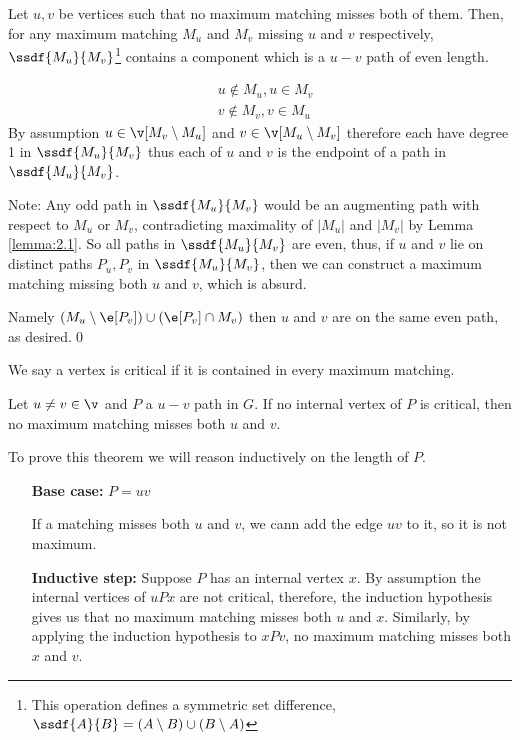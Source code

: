 \begin{prf}
    \begin{customclaim}{1}
    \label{claim:theorem_2.10_1}
        Let $u, v$ be vertices such that no maximum matching misses both of them. Then, for any maximum matching $M_u$ and $M_v$ missing $u$ and $v$ respectively, $\ssdf{M_u}{M_v}$\footnote{This operation defines a symmetric set difference, $\ssdf{A}{B} = (A \setminus B) \cup (B \setminus A)$} contains a component which is a $u - v$ path of even length.
    \end{customclaim}
    \begin{prf}
        \begin{align*}
            &u \notin M_u, u \in M_v\\
            &v \notin M_v, v \in M_u
        \end{align*}
        By assumption $u \in \v[M_v \setminus M_u]$ and $v \in \v[M_u \setminus M_v]$ therefore each have degree 1 in $\ssdf{M_u}{M_v}$ thus each of $u$ and $v$ is the endpoint of a path in $\ssdf{M_u}{M_v}$.

        Note: Any odd path in $\ssdf{M_u}{M_v}$ would be an augmenting path with respect to $M_u$ or $M_v$, contradicting maximality of $|M_u|$ and $|M_v|$ by Lemma \ref{lemma:2.1}. So all paths in $\ssdf{M_u}{M_v}$ are even, thus, if $u$ and $v$ lie on distinct paths $P_u, P_v$ in $\ssdf{M_u}{M_v}$, then we can construct a maximum matching missing both $u$ and $v$, which is absurd.
        
        Namely $(M_u \setminus \e[P_v]) \cup (\e[P_v] \cap M_v)$ then $u$ and $v$ are on the same even path, as desired.\qed
    \end{prf}
    We say a vertex is critical if it is contained in every maximum matching.
    \begin{customclaim}{2}
    \label{claim:theorem_2.10_2}
        Let $u \neq v \in \v$ and $P$ a $u - v$ path in $G$. If no internal vertex of $P$ is critical, then no maximum matching misses both $u$ and $v$.
    \end{customclaim}
    \begin{prf}
        To prove this theorem we will reason inductively on the length of $P$.
        \begin{itemize}
            \item[\textbf{Base case:}] $P = uv$
            
            If a matching misses both $u$ and $v$, we cann add the edge $uv$ to it, so it is not maximum.
            \item[\textbf{Inductive step:}] Suppose $P$ has an internal vertex $x$. By assumption the internal vertices of $uPx$ are not critical, therefore, the induction hypothesis gives us that no maximum matching misses both $u$ and $x$. Similarly, by applying the induction hypothesis to $xPv$, no maximum matching misses both $x$ and $v$.
            

\end{itemize}
\end{prf}
\end{prf}
